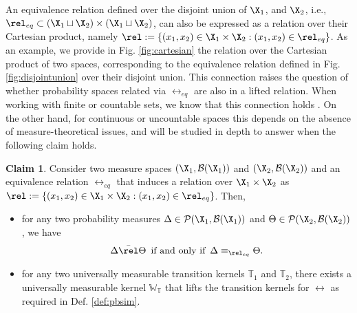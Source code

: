 \documentclass[letterpaper, 10 pt, conference]{amsart}
\theoremstyle{definition}
\theoremstyle{example}
\newtheorem{claim}{Claim}
\theoremstyle{remark}
\newcommand{\Wt}{\mathbb{W}_{\mathbb{T}}}
\begin{document}
An equivalence relation defined over the disjoint union of $\X_1$, and $\X_2$, i.e., $\rel_{eq}\subset (\X_1 \sqcup\X_2)\times (\X_1 \sqcup\X_2)$, 
can also be expressed as a relation over their Cartesian product, namely $\rel:=\{(x_1,x_2)\in \X_1\times\X_2: (x_1,x_2)\in\rel_{eq} \}$. 
As an example, we provide in Fig. \ref{fig:cartesian} the relation over the Cartesian product of two spaces, 
corresponding to the equivalence relation defined in Fig. \ref{fig:disjointunion} over their disjoint union.  
This connection raises the question of whether probability spaces related via $\rel_{eq}$ are also in a lifted relation. 
When working with finite or countable sets, we know that this connection holds \cite{Segala1995}.  
On the other hand, for continuous or uncountable spaces this depends on the absence of measure-theoretical issues, 
and will be studied in depth to answer when the following claim holds. 
\begin{claim} \label{thm:equivprop}
Consider two measure  spaces $(\X_1,\mathcal B (\X_1))$ and $(\X_2,\mathcal B(\X_2))$ and an equivalence relation $\rel_{eq}$ that induces a relation over $\X_1\times \X_2$ as $\rel:=\{(x_1,x_2)\in \X_1\times \X_2: (x_1,x_2)\in\rel_{eq} \}$. 
Then, 
\begin{itemize}
\item for any two probability measures $\Delta\in\mathcal{P}(\X_1,\mathcal B (\X_1))$ and  $\Theta\in\mathcal{P}(\X_2,\mathcal B (\X_2))$, we have 
\[
\Delta\bar \rel \Theta \, \textmd{ if and only if } \, \Delta\equiv_{\rel_{eq}} \Theta. 
\]
\item for any two universally measurable transition kernels $\mathbb T_1$ and $\mathbb T_2$, there exists a universally measurable kernel $\Wt$ that lifts  the transition kernels for $\rel$ as required in Def. \ref{def:pbsim}. 

\end{itemize}
 \end{claim} 
\end{document}
